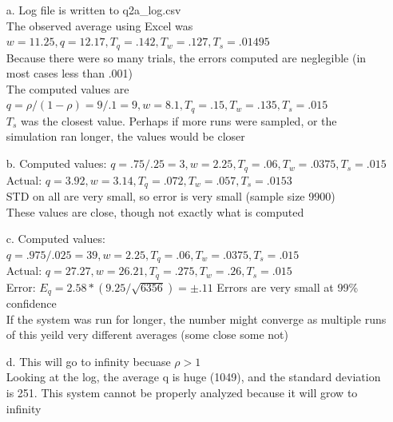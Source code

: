 \documentclass[11pt]{article}
\theoremstyle{definition}
\begin{document}
\begin{enumerate}
	\item[a.] Log file is written to q2a\_log.csv\\
	The observed average using Excel was $w = 11.25, q = 12.17, T_q = .142, T_w = .127, T_s = .01495$\\
	Because there were so many trials, the errors computed are neglegible (in most cases less than .001)\\
	The computed values are $q = \rho / (1 - \rho) = 9 / .1 = 9, w = 8.1, T_q = .15, T_w = .135, T_s = .015$\\
	$T_s$ was the closest value.  Perhaps if more runs were sampled, or the simulation ran longer, the values would be closer
	
	\item[b.] Computed values: $q = .75/.25 = 3, w = 2.25, T_q = .06, T_w = .0375, T_s = .015$\\
			Actual: $q = 3.92, w = 3.14, T_q = .072, T_w = .057, T_s = .0153$\\
			STD on all are very small, so error is very small (sample size 9900)\\
			These values are close, though not exactly what is computed
	
	\item[c.] Computed values: $q = .975/.025 = 39, w = 2.25, T_q = .06, T_w = .0375, T_s = .015$\\
	Actual: $q = 27.27, w = 26.21, T_q = .275, T_w = .26, T_s = .015$\\
	Error:  $E_q = 2.58 * (9.25 / \sqrt{6356}) = \pm.11$ Errors are very small at 99\% confidence\\
	If the system was run for longer, the number might converge as multiple runs of this yeild very different averages (some close some not)
	
	\item[d.] This will go to infinity becuase $\rho > 1$\\
	Looking at the log, the average q is huge (1049), and the standard deviation is 251.  This system cannot be properly analyzed because it will grow to infinity
\end{enumerate}
\end{document}
